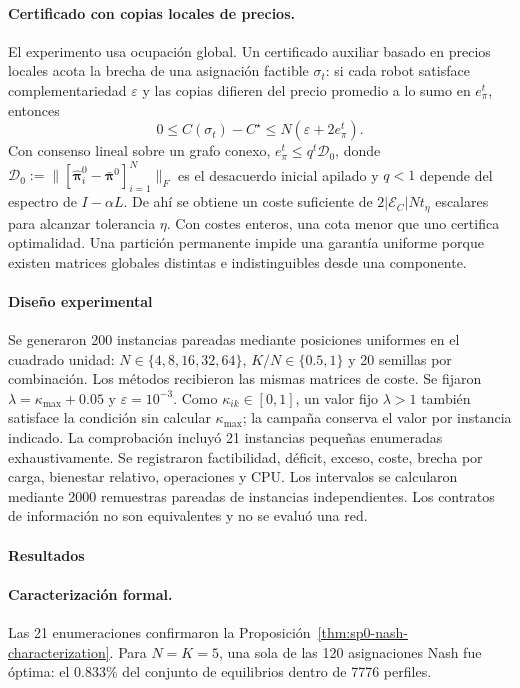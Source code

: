 \paragraph{Certificado con copias locales de precios.}
El experimento usa ocupación global. Un certificado auxiliar basado en precios locales acota la brecha de una asignación factible \(\sigma_t\): si cada robot satisface complementariedad \(\varepsilon\) y las copias difieren del precio promedio a lo sumo en \(e_\pi^t\), entonces
\begin{equation}
 0\leq C(\sigma_t)-C^\star\leq N(\varepsilon+2e_\pi^t).
 \label{eq:sp0-local-price-gap}
\end{equation}
Con consenso lineal sobre un grafo conexo, $e_\pi^t\leq q^t\mathcal D_0$, donde $\mathcal D_0:=\lVert[\widehat{\boldsymbol\pi}_i^0-\bar{\boldsymbol\pi}^0]_{i=1}^N\rVert_F$ es el desacuerdo inicial apilado y $q<1$ depende del espectro de $I-\alpha L$. De ahí se obtiene un coste suficiente de $2|\mathcal E_C|Nt_\eta$ escalares para alcanzar tolerancia $\eta$. Con costes enteros, una cota menor que uno certifica optimalidad. Una partición permanente impide una garantía uniforme porque existen matrices globales distintas e indistinguibles desde una componente.
\fi
\paragraph{Diseño experimental}

Se generaron 200 instancias pareadas mediante posiciones uniformes en el cuadrado unidad: $N\in\{4, 8, 16, 32, 64\}$, $K/N\in\{0.5, 1\}$ y 20 semillas por combinación. Los métodos recibieron las mismas matrices de coste. Se fijaron $\lambda=\kappa_{\max}+0.05$ y $\varepsilon=10^{-3}$. Como $\kappa_{ik}\in[0,1]$, un valor fijo $\lambda>1$ también satisface la condición sin calcular $\kappa_{\max}$; la campaña conserva el valor por instancia indicado. La comprobación incluyó 21 instancias pequeñas enumeradas exhaustivamente. Se registraron factibilidad, déficit, exceso, coste, brecha por carga, bienestar relativo, operaciones y CPU. Los intervalos se calcularon mediante 2000 remuestras pareadas de instancias independientes. Los contratos de información no son equivalentes y no se evaluó una red.

\paragraph{Resultados}

\paragraph{Caracterización formal.}
Las 21 enumeraciones confirmaron la Proposición~\ref{thm:sp0-nash-characterization}. Para \(N=K=5\), una sola de las 120 asignaciones Nash fue óptima: el \(0.833\%\) del conjunto de equilibrios dentro de 7776 perfiles.

